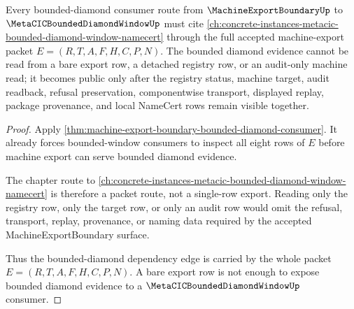 \begin{theorem}
\label{thm:machine-export-boundary-bounded-diamond-packet-route}
Every bounded-diamond consumer route from $\MachineExportBoundaryUp$ to $\MetaCICBoundedDiamondWindowUp$ must cite \autoref{ch:concrete-instances-metacic-bounded-diamond-window-namecert} through the full accepted machine-export packet $E=(R,T,A,F,H,C,P,N)$. The bounded diamond evidence cannot be read from a bare export row, a detached registry row, or an audit-only machine read; it becomes public only after the registry status, machine target, audit readback, refusal preservation, componentwise transport, displayed replay, package provenance, and local NameCert rows remain visible together.
\end{theorem}
\begin{proof}
Apply \autoref{thm:machine-export-boundary-bounded-diamond-consumer}. It already forces bounded-window consumers to inspect all eight rows of $E$ before machine export can serve bounded diamond evidence.

The chapter route to \autoref{ch:concrete-instances-metacic-bounded-diamond-window-namecert} is therefore a packet route, not a single-row export. Reading only the registry row, only the target row, or only an audit row would omit the refusal, transport, replay, provenance, or naming data required by the accepted MachineExportBoundary surface.

Thus the bounded-diamond dependency edge is carried by the whole packet $E=(R,T,A,F,H,C,P,N)$. A bare export row is not enough to expose bounded diamond evidence to a $\MetaCICBoundedDiamondWindowUp$ consumer.
\end{proof}
